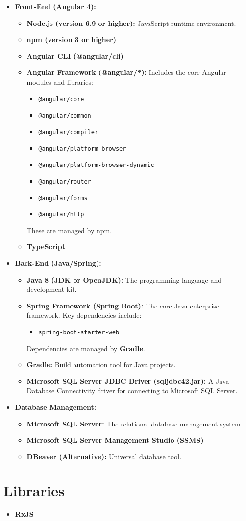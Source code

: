 \documentclass[12pt]{article}
\begin{document}
\begin{itemize}
    \item \textbf{Front-End (Angular 4):}
    \begin{itemize}
        \item \textbf{Node.js (version 6.9 or higher):} JavaScript runtime environment.
        \item \textbf{npm (version 3 or higher)} 
        \item \textbf{Angular CLI (@angular/cli)}
        \item \textbf{Angular Framework (@angular/*):} Includes the core Angular modules and libraries:
        \begin{itemize}
            \item \texttt{@angular/core}
            \item \texttt{@angular/common}
            \item \texttt{@angular/compiler}
            \item \texttt{@angular/platform-browser}
            \item \texttt{@angular/platform-browser-dynamic}
            \item \texttt{@angular/router}
            \item \texttt{@angular/forms}
            \item \texttt{@angular/http}
        \end{itemize}
        These are managed by npm.
        \item \textbf{TypeScript}
    \end{itemize}
    \item \textbf{Back-End (Java/Spring):}
    \begin{itemize}
        \item \textbf{Java 8 (JDK or OpenJDK):} The programming language and development kit.
        \item \textbf{Spring Framework (Spring Boot):} The core Java enterprise framework. Key dependencies include:
        \begin{itemize}
            \item \texttt{spring-boot-starter-web}
        \end{itemize}
        Dependencies are managed by \textbf{Gradle}.
        \item \textbf{Gradle:} Build automation tool for Java projects.
        \item \textbf{Microsoft SQL Server JDBC Driver (sqljdbc42.jar):} A Java Database Connectivity driver for connecting to Microsoft SQL Server.
    \end{itemize}
    \item \textbf{Database Management:}
    \begin{itemize}
        \item \textbf{Microsoft SQL Server:} The relational database management system.
        \item \textbf{Microsoft SQL Server Management Studio (SSMS)}
        \item \textbf{DBeaver (Alternative):} Universal database tool.
    \end{itemize}
\end{itemize}

\section*{Libraries}
\begin{itemize}
    \item \textbf{RxJS} 
\end{itemize}
\end{document}
